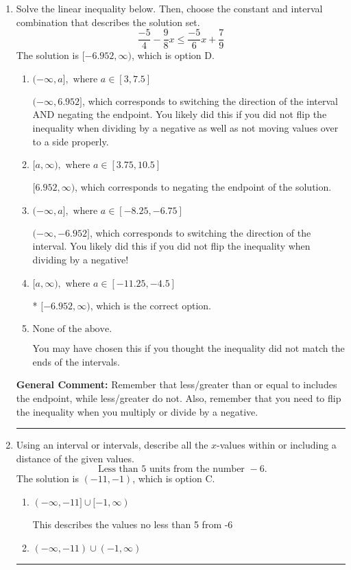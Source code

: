 \documentclass{extbook}[14pt]
\newcommand{\litem}[1]{\item #1

\rule{\textwidth}{0.4pt}}
\begin{document}
\begin{enumerate}\litem{
Solve the linear inequality below. Then, choose the constant and interval combination that describes the solution set.
\[ \frac{-5}{4} - \frac{9}{8} x \leq \frac{-5}{6} x + \frac{7}{9} \]The solution is \( [-6.952, \infty) \), which is option D.\begin{enumerate}[label=\Alph*.]
\item \( (-\infty, a], \text{ where } a \in [3, 7.5] \)

 $(-\infty, 6.952]$, which corresponds to switching the direction of the interval AND negating the endpoint. You likely did this if you did not flip the inequality when dividing by a negative as well as not moving values over to a side properly.
\item \( [a, \infty), \text{ where } a \in [3.75, 10.5] \)

 $[6.952, \infty)$, which corresponds to negating the endpoint of the solution.
\item \( (-\infty, a], \text{ where } a \in [-8.25, -6.75] \)

 $(-\infty, -6.952]$, which corresponds to switching the direction of the interval. You likely did this if you did not flip the inequality when dividing by a negative!
\item \( [a, \infty), \text{ where } a \in [-11.25, -4.5] \)

* $[-6.952, \infty)$, which is the correct option.
\item \( \text{None of the above}. \)

You may have chosen this if you thought the inequality did not match the ends of the intervals.
\end{enumerate}

\textbf{General Comment:} Remember that less/greater than or equal to includes the endpoint, while less/greater do not. Also, remember that you need to flip the inequality when you multiply or divide by a negative.
}
\litem{
Using an interval or intervals, describe all the $x$-values within or including a distance of the given values.
\[ \text{ Less than } 5 \text{ units from the number } -6. \]The solution is \( (-11, -1) \), which is option C.\begin{enumerate}[label=\Alph*.]
\item \( (-\infty, -11] \cup [-1, \infty) \)

This describes the values no less than 5 from -6
\item \( (-\infty, -11) \cup (-1, \infty) \)


\end{enumerate}}
\end{enumerate}
\end{document}
